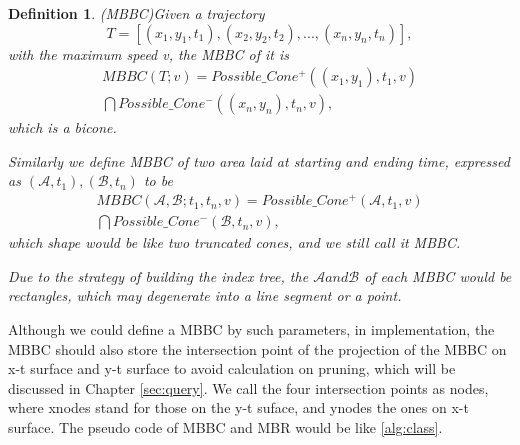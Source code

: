 \documentclass[sigplan]{acmart}
\newtheorem{myDef}{Definition}
\begin{document}
\begin{myDef}
(MBBC)Given a trajectory $$T=[(x_1,y_1,t_1), (x_2,y_2,t_2), ..., (x_n,y_n,t_n)],$$with the maximum speed v, the MBBC of it is
$$
\begin{aligned}
MBBC(T;v)=Possible\_Cone^+((x_1,y_1),t_1,v)\\
\bigcap Possible\_Cone^-((x_n,y_n),t_n,v),
\end{aligned}
$$
which is a bicone. %
\par
Similarly we define MBBC of two area laid at starting and ending time, expressed as $(\mathcal{A},t_1),(\mathcal{B},t_n)$ to be
$$
\begin{aligned}
MBBC(\mathcal{A},\mathcal{B};t_1,t_n,v)=Possible\_Cone^+(\mathcal{A},t_1,v)\\
\bigcap Possible\_Cone^-(\mathcal{B},t_n,v),
\end{aligned}
$$
which shape would be like two truncated cones, and we still call it MBBC.\par
Due to the strategy of building the index tree, the $\mathcal{A} and \mathcal{B}$ of each MBBC would be rectangles, which may degenerate into a line segment or a point.
\end{myDef}

Although we could define a MBBC by such parameters, in implementation, the MBBC should also store the intersection point of the projection of the MBBC on x-t surface and y-t surface to avoid calculation on pruning, which will be discussed in Chapter \ref{sec:query}. We call the four intersection points as nodes, where xnodes stand for those on the y-t suface, and ynodes the ones on x-t surface. The pseudo code of MBBC and MBR would be like \ref{alg:class}.
\end{document}
